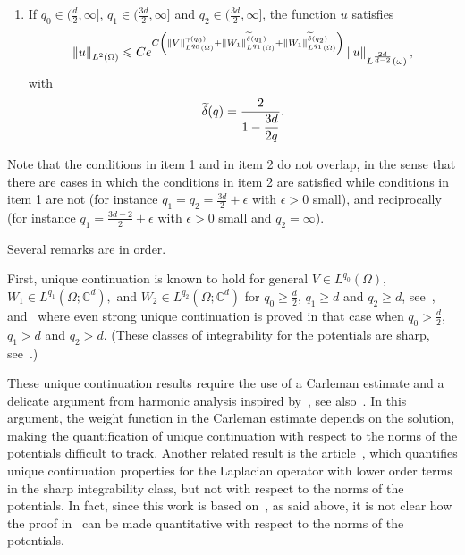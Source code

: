 \documentclass[AHL,Unicode,longabstracts]{cedram}
\newcommand*\C{\mathbb{C}}
\newcommand*\ds{\displaystyle}
\newcommand{\norm}[1]{\left\Vert#1\right\Vert}
\renewcommand{\geq}{\geqslant}
\renewcommand{\tilde}{\widetilde}
\let\oldtilde\tilde
\renewcommand*{\tilde}[1]{\mathchoice{\widetilde{#1}}{\widetilde{#1}}{\oldtilde{#1}}{\oldtilde{#1}}}
\begin{document}
\begin{theo}
\begin{enumerate}
\item\label{theo1.3.2} If $q_0 \in (\frac{d}{2}, \infty]$, $q_1 \in (\frac{3d}{2}, \infty]$ and $q_2\in (\frac{3d}{2}, \infty]$, the function $u$ satisfies
\begin{equation}\label{Quantitative}
\norm{u }_{L^2(\Omega)} \leqslant C e^{ C \left(\norm{V}_{L^{q_0}(\Omega)}^{\gamma(q_0)}+\norm{W_1}_{L^{q_1}(\Omega)}^{\tilde\delta(q_1)} + \norm{W_1}_{L^{q_1}(\Omega)}^{\tilde\delta(q_2)}
\right) }\norm{u}_{L^{\frac{2d}{d-2}}(\omega)},
\end{equation}
with
\begin{equation*}
\tilde \delta(q) = \frac{2}{\ds 1 - \frac{3d}{2q}}.
\end{equation*}
\end{enumerate}
\end{theo}

\begin{rema}
Note that the conditions in item 1 and in item 2 do not overlap, in the sense that there are cases in which the conditions in item 2 are satisfied while conditions in item 1 are not (for instance $q_1 = q_2 = \frac{3d}{2} + \epsilon$ with $\epsilon >0$ small), and reciprocally (for instance $q_1 = \frac{3d-2}{2} + \epsilon$ with $\epsilon>0$ small and $q_2 = \infty$).
\end{rema}

Several remarks are in order.

First, unique continuation is known to hold for general $ V\in L^{q_0}(\Omega)$, $W_1 \in L^{q_1}(\Omega; \C^d),$ and $W_2 \in L^{q_2}(\Omega; \C^d)$ for $q_0 \geq \frac{d}{2}$, $q_1\geq d$ and $q_2 \geq d$, see~\cite{Wolff-1993}, and~\cite{koch2001carleman} where even strong unique continuation is proved in that case when $q_0 > \frac{d}{2}$, $q_1 > d$ and $q_2 > d$. (These classes of integrability for the potentials are sharp, see~\cite{koch2002sharp}.)

These unique continuation results require the use of a Carleman estimate and a delicate argument from harmonic analysis inspired by~\cite{wolff1992property}, see also~\cite{koch2001carleman}. In this argument, the weight function in the Carleman estimate depends on the solution, making the quantification of unique continuation with respect to the norms of the potentials difficult to track. Another related result is the article~\cite{malinnikova2012quantitative}, which quantifies unique continuation properties for the Laplacian operator with lower order terms in the sharp integrability class, but not with respect to the norms of the potentials. In fact, since this work is based on~\cite{koch2001carleman}, as said above, it is not clear how the proof in~\cite{malinnikova2012quantitative} can be made quantitative with respect to the norms of the potentials.
\end{document}
